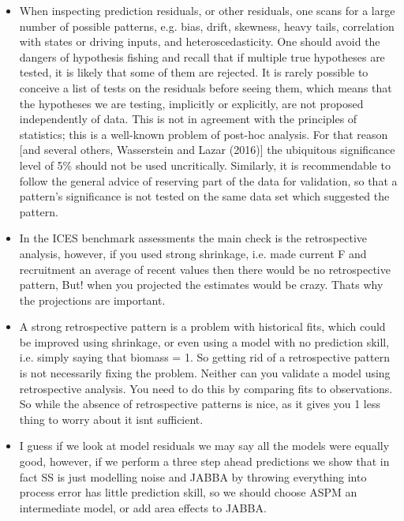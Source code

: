 \begin{itemize}
    \item When inspecting prediction residuals, or other residuals, one scans for a large number of possible patterns, e.g. bias, drift, skewness, heavy tails, correlation with states or driving inputs, and heteroscedasticity. One should avoid the dangers of hypothesis fishing and recall that if multiple true hypotheses are tested, it is likely that some of them are rejected. It is rarely possible to conceive a list of tests on the residuals before seeing them, which means that the hypotheses we are testing, implicitly or explicitly, are not proposed independently of data. This is not in agreement with the principles of statistics; this is a well-known problem of post-hoc analysis. For that reason [and several others, Wasserstein and Lazar (2016)] the ubiquitous significance level of 5\% should not be used uncritically. Similarly, it is recommendable to follow the general advice of reserving part of the data for validation, so that a pattern’s significance is not tested on the same data set which suggested the pattern.

    \item In the ICES benchmark assessments the main check is the retrospective analysis, however, if you used strong shrinkage, i.e. made current F and recruitment an average of recent values then there would be no retrospective pattern, But! when you projected the estimates would be crazy. Thats why the projections are important.

    \item A strong retrospective pattern is a problem with historical fits, which could be improved using shrinkage, or even using a model with no prediction skill, i.e. simply saying that biomass = 1. So getting rid of a retrospective pattern is not necessarily fixing the problem. Neither can you validate a model using retrospective analysis. You need to do this by comparing fits to observations. So while the absence of retrospective patterns is nice, as it gives you 1 less thing to worry about it isnt sufficient.
    
    \item I guess if we look at  model residuals we may say all the models were equally good, however, if we perform a three step ahead predictions we show that in fact SS is just modelling noise and JABBA by throwing everything into process error has little prediction skill, so we should choose ASPM an intermediate model, or add area effects to JABBA.


\end{itemize}
